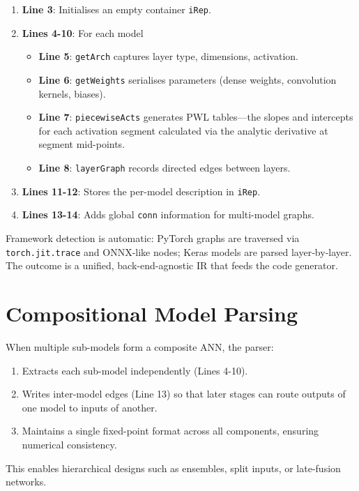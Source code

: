 \begin{enumerate}
  \item \textbf{Line 3}: Initialises an empty container \texttt{iRep}.
  \item \textbf{Lines 4-10}: For each model
        \begin{itemize}
          \item \textbf{Line 5}: \texttt{getArch} captures layer type, dimensions, activation.
          \item \textbf{Line 6}: \texttt{getWeights} serialises parameters (dense weights, convolution kernels, biases).
          \item \textbf{Line 7}: \texttt{piecewiseActs} generates PWL tables—the slopes and intercepts for each activation segment calculated via the analytic derivative at segment mid-points.
          \item \textbf{Line 8}: \texttt{layerGraph} records directed edges between layers.
        \end{itemize}
  \item \textbf{Lines 11-12}: Stores the per-model description in \texttt{iRep}.
  \item \textbf{Lines 13-14}: Adds global \texttt{conn} information for multi-model graphs.
\end{enumerate}

Framework detection is automatic: PyTorch graphs are traversed via \texttt{torch.jit.trace} and ONNX-like nodes; Keras models are parsed layer‐by‐layer.  
The outcome is a unified, back-end-agnostic IR that feeds the code generator.

\section{Compositional Model Parsing}

When multiple sub-models form a composite ANN, the parser:

\begin{enumerate}
  \item Extracts each sub-model independently (Lines 4-10).
  \item Writes inter-model edges (Line 13) so that later stages can route outputs of one model to inputs of another.
  \item Maintains a single fixed-point format across all components, ensuring numerical consistency.
\end{enumerate}

This enables hierarchical designs such as ensembles, split inputs, or late-fusion networks.

